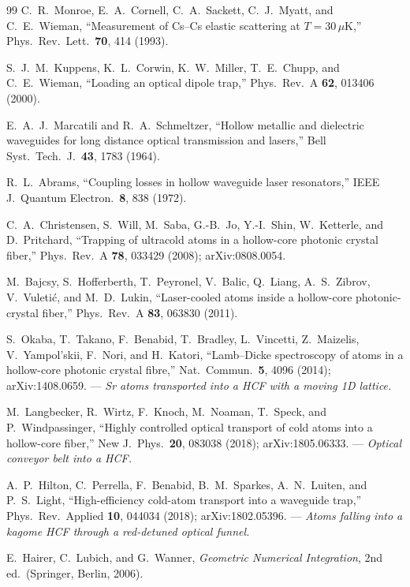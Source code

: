 \documentclass[11pt,a4paper]{article}
\begin{document}
\begin{thebibliography}{99}
 C.~R.~Monroe, E.~A.~Cornell, C.~A.~Sackett, C.~J.~Myatt, and C.~E.~Wieman, ``Measurement of Cs--Cs elastic scattering at $T=30\,\mu$K,'' Phys.\ Rev.\ Lett.\ \textbf{70}, 414 (1993).

 S.~J.~M.~Kuppens, K.~L.~Corwin, K.~W.~Miller, T.~E.~Chupp, and C.~E.~Wieman, ``Loading an optical dipole trap,'' Phys.\ Rev.\ A \textbf{62}, 013406 (2000).

 E.~A.~J.~Marcatili and R.~A.~Schmeltzer, ``Hollow metallic and dielectric waveguides for long distance optical transmission and lasers,'' Bell Syst.\ Tech.\ J.\ \textbf{43}, 1783 (1964).

 R.~L.~Abrams, ``Coupling losses in hollow waveguide laser resonators,'' IEEE J.\ Quantum Electron.\ \textbf{8}, 838 (1972).

 C.~A.~Christensen, S.~Will, M.~Saba, G.-B.~Jo, Y.-I.~Shin, W.~Ketterle, and D.~Pritchard, ``Trapping of ultracold atoms in a hollow-core photonic crystal fiber,'' Phys.\ Rev.\ A \textbf{78}, 033429 (2008); arXiv:0808.0054.

 M.~Bajcsy, S.~Hofferberth, T.~Peyronel, V.~Balic, Q.~Liang, A.~S.~Zibrov, V.~Vuletić, and M.~D.~Lukin, ``Laser-cooled atoms inside a hollow-core photonic-crystal fiber,'' Phys.\ Rev.\ A \textbf{83}, 063830 (2011).

 S.~Okaba, T.~Takano, F.~Benabid, T.~Bradley, L.~Vincetti, Z.~Maizelis, V.~Yampol'skii, F.~Nori, and H.~Katori, ``Lamb--Dicke spectroscopy of atoms in a hollow-core photonic crystal fibre,'' Nat.\ Commun.\ \textbf{5}, 4096 (2014); arXiv:1408.0659. --- \emph{Sr atoms transported into a HCF with a moving 1D lattice.}

 M.~Langbecker, R.~Wirtz, F.~Knoch, M.~Noaman, T.~Speck, and P.~Windpassinger, ``Highly controlled optical transport of cold atoms into a hollow-core fiber,'' New J.\ Phys.\ \textbf{20}, 083038 (2018); arXiv:1805.06333. --- \emph{Optical conveyor belt into a HCF.}

 A.~P.~Hilton, C.~Perrella, F.~Benabid, B.~M.~Sparkes, A.~N.~Luiten, and P.~S.~Light, ``High-efficiency cold-atom transport into a waveguide trap,'' Phys.\ Rev.\ Applied \textbf{10}, 044034 (2018); arXiv:1802.05396. --- \emph{Atoms falling into a kagome HCF through a red-detuned optical funnel.}

 E.~Hairer, C.~Lubich, and G.~Wanner, \emph{Geometric Numerical Integration}, 2nd ed.\ (Springer, Berlin, 2006).


\end{thebibliography}
\end{document}
